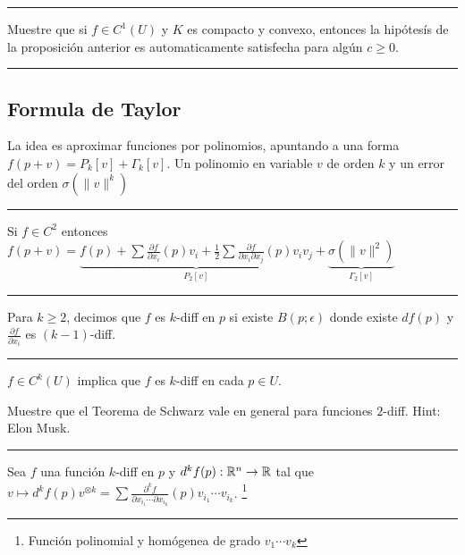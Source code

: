 \E

\hrule
\begin{exercise}
    Muestre que si \(f\in C^1(U)\) y \(K\) es compacto y convexo, entonces la hipótesís de la proposición anterior es automaticamente satisfecha para algún \(c\geq 0\). 
\end{exercise}
\hrule 

\E

\subsection*{Formula de Taylor}

\begin{note}
    La idea es aproximar funciones por polinomios, apuntando a una forma \(f(p+v) = P_k[v] + \Gamma_k[v]\). Un polinomio en variable \(v\) de orden \(k\) y un error del orden \(\sigma (\|v\|^k)\)
\end{note}

\E

\hrule
\begin{example}
    Si \(f\in C^2\) entonces \( f(p+v) = \underbrace{f(p) + \sum \frac{\partial f }{\partial x_i}(p)v_i+ \frac{1}{2}\sum \frac{\partial f}{\partial x_i \partial x_j}(p) v_iv_j}_{P_2[v]} + \underbrace{\sigma(\|v\|^2)}_{\Gamma_2[v]}\)
\end{example}
\hrule 

\E 

\begin{definition}
    Para \(k\geq 2\), decimos que \(f\) es \(k\)-diff en \(p\) si existe \(B(p;\epsilon)\) donde existe \(df(p)\) y \(\frac{\partial f }{\partial x_i}\) es \((k-1)\)-diff. 
\end{definition}

\E 

\hrule 
\begin{example}
    \(f \in C^k(U)\)  implica que \(f\)  es \(k\)-diff en cada \(p\in U\). 
\end{example} 
\begin{exercise}
    Muestre que el Teorema de Schwarz vale en general para funciones \(2\)-diff. Hint: Elon Musk. 
\end{exercise}
\hrule 

\E

\begin{definition}
    Sea \(f\) una función \(k\)-diff en \(p\) y \(d^kf(p): \mathbb{R}^n \rightarrow \mathbb{R}\) tal que \(v\mapsto d^kf(p)v^{\otimes k} = \sum \frac{\partial^k f }{\partial x_{i_1}  \cdots \partial x_{i_k}}(p)v_{i_1}\cdots v_{i_k}\). \footnote{Función polinomial y homógenea de grado \(v_1\cdots v_k\)}
\end{definition}

